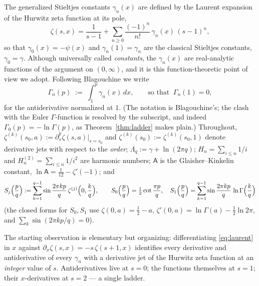 \documentclass[11pt]{article}
\theoremstyle{remark}
\newcommand{\Glaisher}{\mathsf{A}}
\newcommand{\lntwopi}{\ln 2\pi}
\begin{document}
The generalized Stieltjes constants $\gamma_n(x)$ are defined by the Laurent
expansion of the Hurwitz zeta function at its pole,
\begin{equation}\label{eq:laurent}
\zeta(s,x)=\frac{1}{s-1}+\sum_{n\ge0}\frac{(-1)^n}{n!}\,\gamma_n(x)\,(s-1)^n ,
\end{equation}
so that $\gamma_0(x)=-\psi(x)$ and $\gamma_n(1)=\gamma_n$ are the classical
Stieltjes constants, $\gamma_0=\gamma$. Although universally called
\emph{constants}, the $\gamma_n(x)$ are real-analytic functions of the
argument on $(0,\infty)$, and it is this function-theoretic point of view we
adopt. Following Blagouchine \cite{BlagouchineRJ,BlagouchineJNT} we write
\[
\Gamma_{\!n}(p)\;:=\;\int_1^p\gamma_n(x)\,dx ,
\qquad\text{so that }\ \Gamma_{\!n}(1)=0 ,
\]
for the antiderivative normalized at $1$. (The notation is Blagouchine's; the
clash with the Euler $\Gamma$-function is resolved by the subscript, and
indeed $\Gamma_{\!0}(p)=-\ln\Gamma(p)$, as Theorem~\ref{thm:ladder} makes
plain.) Throughout, $\zeta^{(k)}(s_0,a):=\partial_s^k\zeta(s,a)\big|_{s=s_0}$
and $\zeta^{(k)}(s_0):=\zeta^{(k)}(s_0,1)$ denote derivative jets with respect
to the \emph{order}; $\Lambda_q:=\gamma+\ln(2\pi q)$; $H_n=\sum_{i\le n}1/i$ and
$H_n^{(2)}=\sum_{i\le n}1/i^2$ are harmonic numbers; $\Glaisher$ is the
Glaisher--Kinkelin constant, $\ln\Glaisher=\tfrac1{12}-\zeta'(-1)$; and
\[
S_j\Bigl(\frac pq\Bigr):=\sum_{k=1}^{q-1}\sin\frac{2\pi kp}{q}\,
\zeta^{(j)}\Bigl(0,\frac kq\Bigr),
\qquad
S_0\Bigl(\frac pq\Bigr)=\tfrac12\cot\frac{\pi p}{q},
\quad
S_1\Bigl(\frac pq\Bigr)=\sum_{k=1}^{q-1}\sin\frac{2\pi kp}{q}\,\ln\Gamma\Bigl(\frac kq\Bigr)
\]
(the closed forms for $S_0,S_1$ use $\zeta(0,a)=\tfrac12-a$,
$\zeta'(0,a)=\ln\Gamma(a)-\tfrac12\lntwopi$, and
$\sum_k\sin(2\pi kp/q)=0$).

The starting observation is elementary but organizing: differentiating
\eqref{eq:laurent} in $x$ against $\partial_x\zeta(s,x)=-s\,\zeta(s+1,x)$
identifies every derivative and antiderivative of every $\gamma_n$ with a
derivative jet of the Hurwitz zeta function at an \emph{integer} value of
$s$. Antiderivatives live at $s=0$; the functions themselves at $s=1$; their
$x$-derivatives at $s=2$ \cite{Coffey} — a single ladder.
\end{document}
